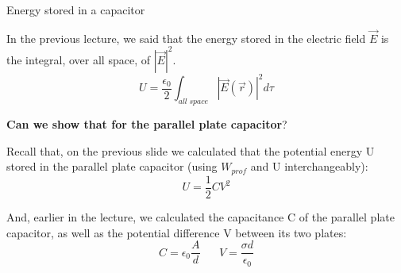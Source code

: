 %
%
%

\begin{frame}{Energy stored in a capacitor}

In the previous lecture, we said that the energy stored in the
electric field $\vec{E}$ is the integral, over all space, of $|\vec{E}|^2$.\\
\begin{equation*}
   U = \frac{\epsilon_0}{2} \int_{all\;space} |\vec{E}(\vec{r})|^2  d\tau
\end{equation*}
\vspace{0.1cm}

{\bf Can we show that for the parallel plate capacitor}?\\

\vspace{0.2cm}

{\small
Recall that,
on the previous slide
we calculated that the potential energy U stored in the parallel plate capacitor
(using $W_{prof}$ and U interchangeably):
\begin{equation*}
  U = \frac{1}{2} C V^2
\end{equation*}

And, earlier in the lecture, we calculated
the capacitance C of the parallel plate capacitor, as well as the
potential difference V between its two plates:
\begin{equation*}
  C = \epsilon_0 \frac{A}{d} \;\;\;\;\;\;
  V = \frac{\sigma d}{\epsilon_0}
\end{equation*}
}

\end{frame}

%
%
%

